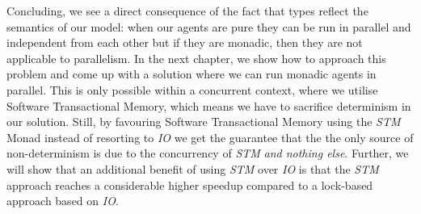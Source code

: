 Concluding, we see a direct consequence of the fact that types reflect the semantics of our model: when our agents are pure they can be run in parallel and independent from each other but if they are monadic, then they are not applicable to parallelism. In the next chapter, we show how to approach this problem and come up with a solution where we can run monadic agents in parallel. This is only possible within a concurrent context, where we utilise Software Transactional Memory, which means we have to sacrifice determinism in our solution. Still, by favouring Software Transactional Memory using the \textit{STM} Monad instead of resorting to \textit{IO} we get the guarantee that the the only source of non-determinism is due to the concurrency of \textit{STM} \textit{and nothing else}. Further, we will show that an additional benefit of using \textit{STM} over \textit{IO} is that the \textit{STM} approach reaches a considerable higher speedup compared to a lock-based approach based on \textit{IO}. 